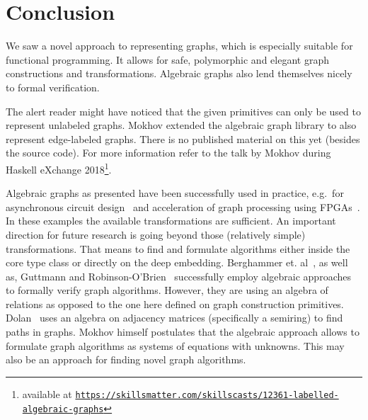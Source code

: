 \documentclass{article}
\begin{document}
\section{Conclusion}\label{sec:conclusion}
We saw a novel approach to representing graphs, which is especially suitable for
functional programming. It allows for safe, polymorphic and elegant graph
constructions and transformations. Algebraic graphs also lend themselves nicely
to formal verification.

The alert reader might have noticed that the given primitives can only be used
to represent unlabeled graphs. Mokhov extended the algebraic graph library to
also represent edge-labeled graphs. There is no published material on this yet
(besides the source code). For more information refer to the talk by Mokhov
during Haskell eXchange 2018\footnote{available at
  \texttt{\href{https://skillsmatter.com/skillscasts/12361-labelled-algebraic-graphs}{https://skillsmatter.com/skillscasts/12361-labelled-algebraic-graphs}}}.

Algebraic graphs as presented have been successfully used in practice, e.g.\ for
asynchronous circuit design~\cite{beaumont2017high} and acceleration of graph
processing using FPGAs~\cite{mokhov2019language}. In these examples
the available transformations are sufficient. An important direction for future
research is going beyond those (relatively simple) transformations. That means
to find and formulate algorithms either inside the core type class or directly
on the deep embedding. Berghammer et. al~\cite{berghammer2020relational}, as well
as, Guttmann and Robinson-O'Brien~\cite{Relational_Minimum_Spanning_Trees-AFP}
successfully employ algebraic approaches to formally verify graph algorithms.
However, they are using an algebra of relations as opposed to the one here
defined on graph construction primitives. Dolan~\cite{dolan2013fun} uses an
algebra on adjacency matrices (specifically a semiring) to find paths in graphs.
Mokhov himself postulates that the algebraic approach allows to formulate graph
algorithms as systems of equations with unknowns. This may also be an approach
for finding novel graph algorithms.

\printbibliography
\end{document}
